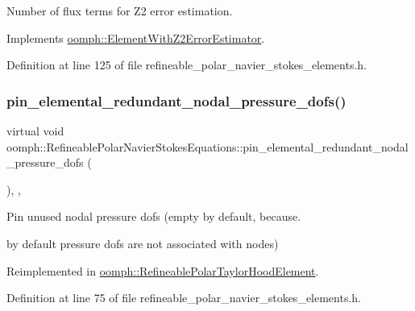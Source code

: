 Number of \textquotesingle{}flux\textquotesingle{} terms for Z2 error estimation. 



Implements \hyperlink{classoomph_1_1ElementWithZ2ErrorEstimator_ae82c5728902e13da31be19c390fc28e3}{oomph\+::\+Element\+With\+Z2\+Error\+Estimator}.



Definition at line 125 of file refineable\+\_\+polar\+\_\+navier\+\_\+stokes\+\_\+elements.\+h.

\mbox{\label{classoomph_1_1RefineablePolarNavierStokesEquations_a29a784c096caf88d102b8fd13dc686e6}} 
\subsubsection{\texorpdfstring{pin\+\_\+elemental\+\_\+redundant\+\_\+nodal\+\_\+pressure\+\_\+dofs()}{pin\_elemental\_redundant\_nodal\_pressure\_dofs()}}
{\footnotesize\ttfamily virtual void oomph\+::\+Refineable\+Polar\+Navier\+Stokes\+Equations\+::pin\+\_\+elemental\+\_\+redundant\+\_\+nodal\+\_\+pressure\+\_\+dofs (\begin{DoxyParamCaption}{ }\end{DoxyParamCaption})\hspace{0.3cm}{\ttfamily [inline]}, {\ttfamily [protected]}, {\ttfamily [virtual]}}



Pin unused nodal pressure dofs (empty by default, because. 

by default pressure dofs are not associated with nodes) 

Reimplemented in \hyperlink{classoomph_1_1RefineablePolarTaylorHoodElement_a6c4de6358f04635ecd54ef87487d7ada}{oomph\+::\+Refineable\+Polar\+Taylor\+Hood\+Element}.



Definition at line 75 of file refineable\+\_\+polar\+\_\+navier\+\_\+stokes\+\_\+elements.\+h.



